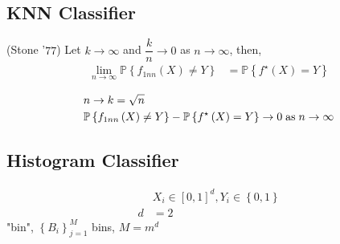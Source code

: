 \documentclass{article}
\begin{document}
\subsection{KNN Classifier}
\begin{thm} \label{thm:knn} 
(Stone '$77$) Let $k  \to  \infty$ and $\dfrac{k}{n} \to  0$ as $n  \to  \infty$, then,
\begin{align*}
\lim_{n \to  \infty} \mathbb{P}\left\{f_{1nn} \left(X\right) \neq  Y\right\} &= \mathbb{P}\left\{f^\star \left(X\right) = Y \right\}
\end{align*}\end{thm}
\begin{align*}
&  n  \to  k = \sqrt{n}
\\ &  \mathbb{P}\left\{f_{1nn} \left(X\right) \neq  Y\right\} - \mathbb{P}\left\{f^\star \left(X\right) = Y \right\} \to  0 \text{\;as\;} n \to  \infty
\end{align*}


\subsection{Histogram Classifier}
\begin{align*}
&X_{i} \in \left[0, 1\right]^{d}, Y_{i} \in \left\{0, 1\right\}
\\ d  &= 2
\end{align*}
"bin", $\left\{B_{i}\right\}_{j=1}^{M}$ bins, $M  = m^{d}$
\end{document}
